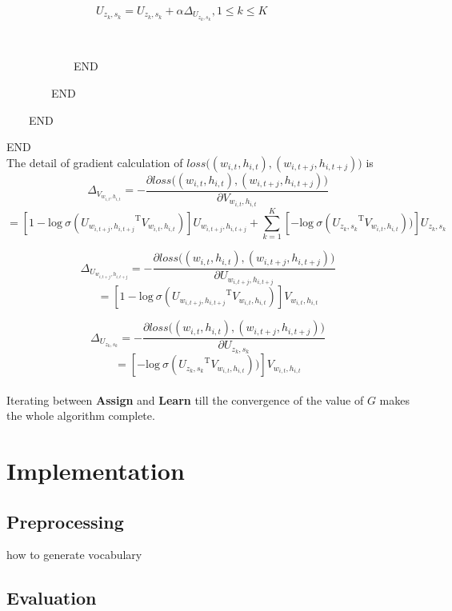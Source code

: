 \documentclass[12pt,a4paper,twoside]{book}
\begin{document}
\ \ \ \ \ \ \ \ \ \ \ \ \ \ \ \ $U_{z_k,s_k} = U_{z_k,s_k} + \alpha \Delta_{U_{z_k,s_k}}, 1\leq k\leq K$ 

\ \ \ \ \ \ \ \ \ \ \ \ \ \ \ \
 
\ \ \ \ \ \ \ \ \ \ \ \ END 

\ \ \ \ \ \ \ \  END

\ \ \ \ END

END\\

The detail of gradient calculation of $loss\big ( (w_{i,t},h_{i,t}),(w_{i,t+j},h_{i,t+j})\big )$ is
$$\Delta_{V_{w_{i,t},h_{i,t}}} = -\frac{\partial loss\big ( (w_{i,t},h_{i,t}),(w_{i,t+j},h_{i,t+j})\big )}{\partial V_{w_{i,t},h_{i,t}}} $$
$$= [1-\mathrm{log}\ \sigma({U_{w_{i,t+j},h_{i,t+j}}}^{\mathrm{T}}V_{w_{i,t},h_{i,t}})]
U_{w_{i,t+j},h_{i,t+j}}+\sum_{k=1}^K [-\mathrm{log}\ \sigma({U_{z_k,s_k}}^{\mathrm{T}}V_{w_{i,t},h_{i,t}}))]U_{z_k,s_k}$$

$$\Delta_{U_{w_{i,t+j},h_{i,t+j}}} = -\frac{\partial loss\big ( (w_{i,t},h_{i,t}),(w_{i,t+j},h_{i,t+j})\big )}{\partial U_{w_{i,t+j},h_{i,t+j}}}$$
$$=[1-\mathrm{log}\ \sigma({U_{w_{i,t+j},h_{i,t+j}}}^{\mathrm{T}}V_{w_{i,t},h_{i,t}})]
V_{w_{i,t},h_{i,t}}$$

$$\Delta_{U_{z_k,s_k}} = -\frac{\partial loss\big ( (w_{i,t},h_{i,t}),(w_{i,t+j},h_{i,t+j})\big )}{\partial U_{z_k,s_k}}$$
$$=[-\mathrm{log}\ \sigma({U_{z_k,s_k}}^{\mathrm{T}}V_{w_{i,t},h_{i,t}}))]V_{w_{i,t},h_{i,t}}$$

\paragraph{}
Iterating between \textbf{Assign} and \textbf{Learn} till the convergence of the value of $G$ makes the whole algorithm complete. 

\section{Implementation}

\subsection{Preprocessing}
how to generate vocabulary

\subsection{}

\subsection{Evaluation}
\end{document}
